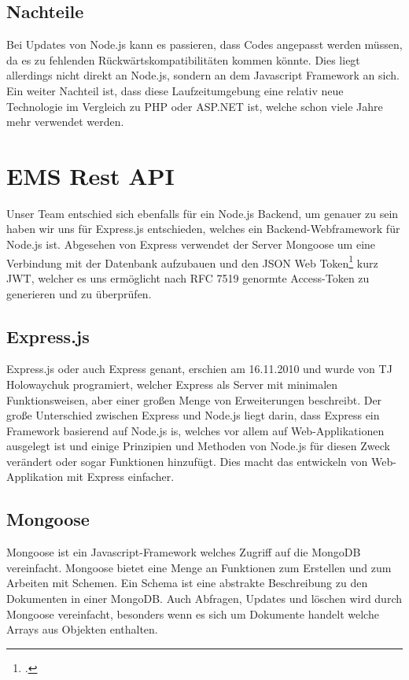 \subsection{Nachteile}
Bei Updates von Node.js kann es passieren, dass Codes angepasst werden müssen, da es zu fehlenden Rückwärtskompatibilitäten kommen könnte. 
Dies liegt allerdings nicht direkt an Node.js, sondern an dem Javascript Framework an sich. Ein weiter Nachteil ist, dass diese Laufzeitumgebung eine relativ neue Technologie im Vergleich zu PHP oder ASP.NET ist, welche schon viele Jahre mehr verwendet werden. 		 		
\section{EMS Rest API} 
Unser Team entschied sich ebenfalls für ein Node.js Backend, um genauer zu sein haben wir uns für Express.js entschieden, welches ein Backend-Webframework für Node.js ist. 
Abgesehen von Express verwendet der Server Mongoose um eine Verbindung mit der Datenbank aufzubauen und den JSON Web Token\footcite{web-token} kurz JWT, welcher es uns ermöglicht nach RFC 7519 genormte Access-Token zu generieren und zu überprüfen. 		 	
\subsection{Express.js}
Express.js oder auch Express genant, erschien am 16.11.2010 und wurde von TJ Holowaychuk programiert, welcher Express als Server mit minimalen Funktionsweisen, aber einer großen Menge von Erweiterungen beschreibt. 
Der große Unterschied zwischen Express und Node.js liegt darin, dass Express ein Framework basierend auf Node.js is, welches vor allem auf Web-Applikationen ausgelegt ist und einige Prinzipien und Methoden von Node.js für diesen Zweck verändert oder sogar Funktionen hinzufügt. 
Dies macht das entwickeln von Web-Applikation mit Express einfacher. 	
\subsection{Mongoose}
Mongoose ist ein Javascript-Framework welches Zugriff auf die MongoDB vereinfacht. 
Mongoose bietet eine Menge an Funktionen zum Erstellen und zum Arbeiten mit Schemen. 
Ein Schema ist eine abstrakte Beschreibung zu den Dokumenten in einer MongoDB. Auch Abfragen, Updates und löschen wird durch Mongoose vereinfacht, besonders wenn es sich um Dokumente handelt welche Arrays aus Objekten enthalten. 		 	
\newpage
